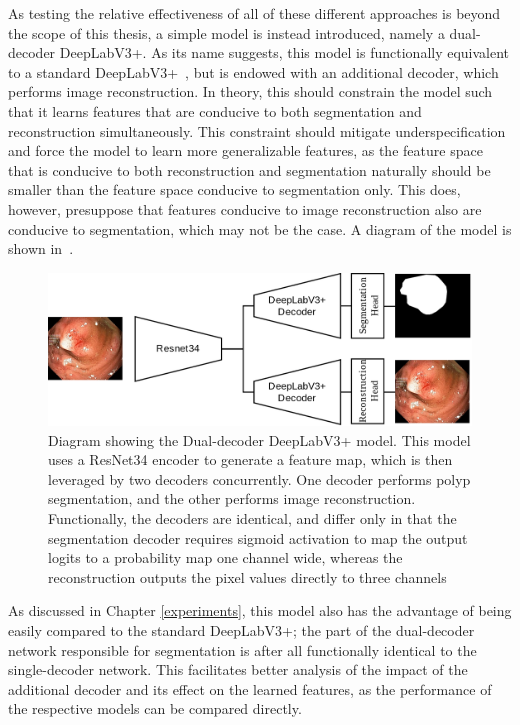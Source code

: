 As testing the relative effectiveness of all of these different approaches is beyond the scope of this thesis, a simple model is instead introduced, namely a dual-decoder DeepLabV3+. As its name suggests, this model is functionally equivalent to a standard DeepLabV3+~\cite{deeplab}, but is endowed with an additional decoder, which performs image reconstruction. In theory, this should constrain the model such that it learns features that are conducive to both segmentation and reconstruction simultaneously. This constraint should mitigate underspecification and force the model to learn more generalizable features, as the feature space that is conducive to both reconstruction and segmentation naturally should be smaller than the feature space conducive to segmentation only. This does, however, presuppose that features conducive to image reconstruction also are conducive to segmentation, which may not be the case. A diagram of the model is shown in~.
\begin{figure}[htb]
    \centering
    \includegraphics[width=\linewidth]{illustrations/InductiveNet.drawio.png}
    \caption[Dual Decoder DeepLabV3]{Diagram showing the Dual-decoder DeepLabV3+ model. This model uses a ResNet34 encoder to generate a feature map, which is then leveraged by two decoders concurrently. One decoder performs polyp segmentation, and the other performs image reconstruction. Functionally, the decoders are identical, and differ only in that the segmentation decoder requires sigmoid activation to map the output logits to a probability map one channel wide, whereas the reconstruction outputs the pixel values directly to three channels}
    \label{fig:dddeeplabv3}
\end{figure}

As discussed in Chapter \ref{experiments}, this model also has the advantage of being easily compared to the standard DeepLabV3+; the part of the dual-decoder network responsible for segmentation is after all functionally identical to the single-decoder network. This facilitates better analysis of the impact of the additional decoder and its effect on the learned features, as the performance of the respective models can be compared directly. 

